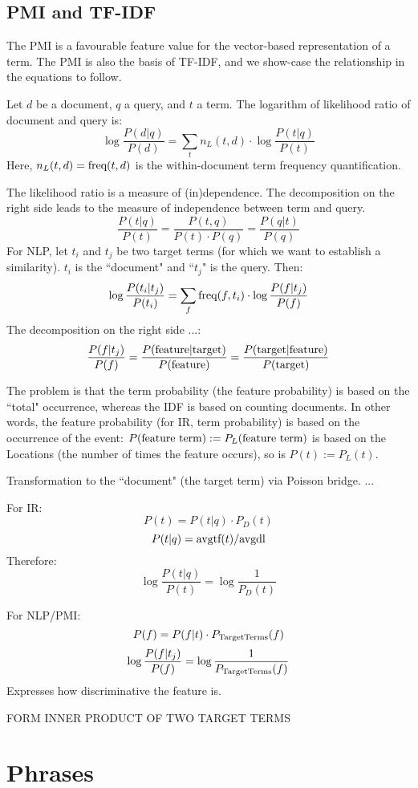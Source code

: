 \subsection{PMI and TF-IDF}

The PMI is a favourable feature value for the vector-based representation
of a term.
The PMI is also the basis of TF-IDF, and we show-case the relationship
in the equations to follow.

Let $d$ be a document, $q$ a query, and $t$ a term.
The logarithm of likelihood ratio of document and query is:
\[
\log\frac{P(d|q)}{P(d)} =
	\sum_t n_L(t,d) \cdot \log\frac{P(t|q)}{P(t)}
\]
Here, $n_L(t,d)=\textmd{freq}(t,d)$ is the within-document term frequency
quantification.

The likelihood ratio is a measure of (in)dependence.
The decomposition on the right side leads to the measure of independence
between term and query.
\[
\frac{P(t|q)}{P(t)} = \frac{P(t,q)}{P(t) \cdot P(q)} = \frac{P(q|t)}{P(q)}
\]
For NLP, let $t_i$ and $t_j$ be two target terms
(for which we want to establish a similarity).
$t_i$ is the ``document" and ``$t_j$" is the query.
Then:
\[
\log\frac{P(t_i|t_j)}{P(t_i)} =
	\sum_f \textmd{freq}(f,t_i) \cdot \log\frac{P(f|t_j)}{P(f)}
\]
The decomposition on the right side ...:
\[
\frac{P(f|t_j)}{P(f)} =
\frac{P(\textmd{feature}|\textmd{target})}{P(\textmd{feature})} =
\frac{P(\textmd{target}|\textmd{feature})}{P(\textmd{target})}
\]

The problem is that the term probability (the feature probability)
is based on the ``total" occurrence, whereas the IDF is based
on counting documents.
In other words,
the feature probability (for IR, term probability) is based on
the occurrence of the event:
$P(\textmd{feature term}):=P_L(\textmd{feature term})$
is based on the Locations (the number of times the feature occurs), so is
$P(t):=P_L(t)$.

Transformation to the ``document" (the target term) via Poisson bridge.
...

For IR:
\[
P(t) = P(t|q) \cdot P_D(t)
\]
\[
P(t|q) = \textmd{avgtf}(t) / \textmd{avgdl}
\]
Therefore:
\[
\log\frac{P(t|q)}{P(t)} = \log\frac{1}{P_D(t)}
\]

For NLP/PMI:
\[
P(f) = P(f|t) \cdot P_\textmd{TargetTerms}(f)
\]
\[
\log\frac{P(f|t_j)}{P(f)} = \log\frac{1}{P_\textmd{TargetTerms}(f)}
\]
Expresses how discriminative the feature is.


FORM INNER PRODUCT OF TWO TARGET TERMS


\section{Phrases}

